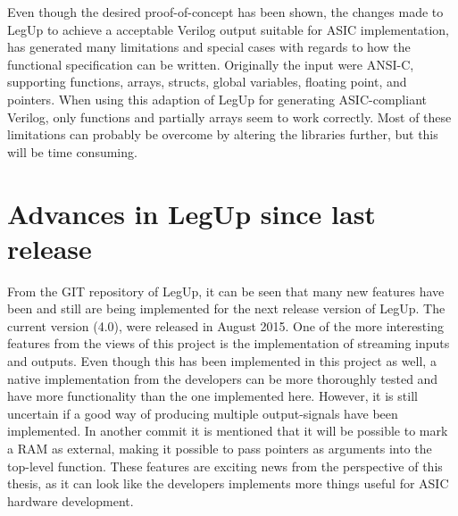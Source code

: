 Even though the desired proof-of-concept has been shown, the changes made to LegUp to achieve a acceptable Verilog output suitable for ASIC implementation, has generated many limitations and special cases with regards to how the functional specification can be written. Originally the input were ANSI-C, supporting functions, arrays, structs, global variables, floating point, and pointers. When using this adaption of LegUp for generating ASIC-compliant Verilog, only functions and partially arrays seem to work correctly. Most of these limitations can probably be overcome by altering the libraries further, but this will be time consuming.

\section{Advances in LegUp since last release}
From the GIT repository of LegUp, it can be seen that many new features have been and still are being implemented for the next release version of LegUp. The current version (4.0), were released in August 2015. One of the more interesting features from the views of this project is the implementation of streaming inputs and outputs. Even though this has been implemented in this project as well, a native implementation from the developers can be more thoroughly tested and have more functionality than the one implemented here. However, it is still uncertain if a good way of producing multiple output-signals have been implemented. In another commit it is mentioned that it will be possible to mark a RAM as external, making it possible to pass pointers as arguments into the top-level function. These features are exciting news from the perspective of this thesis, as it can look like the developers implements more things useful for ASIC hardware development.